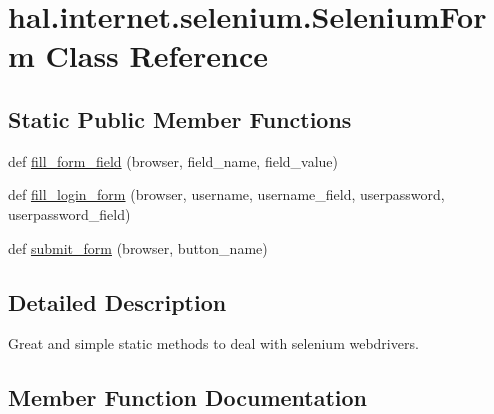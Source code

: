 \hypertarget{classhal_1_1internet_1_1selenium_1_1_selenium_form}{}\section{hal.\+internet.\+selenium.\+Selenium\+Form Class Reference}
\label{classhal_1_1internet_1_1selenium_1_1_selenium_form}
\subsection*{Static Public Member Functions}
\begin{DoxyCompactItemize}
\item 
def \hyperlink{classhal_1_1internet_1_1selenium_1_1_selenium_form_a9523968c9daa9a96f9a7b7ddd358904b}{fill\+\_\+form\+\_\+field} (browser, field\+\_\+name, field\+\_\+value)
\item 
def \hyperlink{classhal_1_1internet_1_1selenium_1_1_selenium_form_aa73bb0384f074f2d1b07f78c7bfb6867}{fill\+\_\+login\+\_\+form} (browser, username, username\+\_\+field, userpassword, userpassword\+\_\+field)
\item 
def \hyperlink{classhal_1_1internet_1_1selenium_1_1_selenium_form_a7648cf31df2f596b9af4f9b9583f2bdb}{submit\+\_\+form} (browser, button\+\_\+name)
\end{DoxyCompactItemize}


\subsection{Detailed Description}
\begin{DoxyVerb}Great and simple static methods to deal with selenium webdrivers. \end{DoxyVerb}
 

\subsection{Member Function Documentation}

